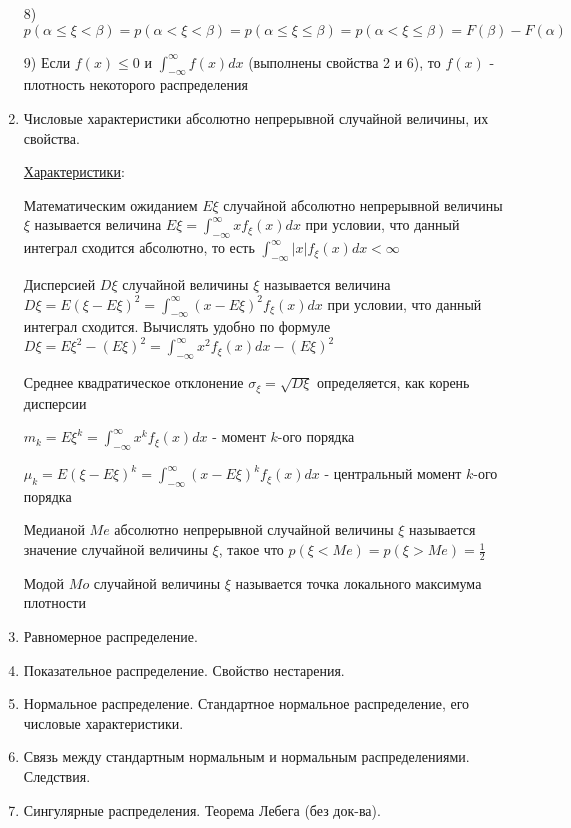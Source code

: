 \begin{enumerate}
    8) $p(\alpha \leq \xi < \beta) = p(\alpha < \xi < \beta) = p(\alpha \leq \xi \leq \beta) = p(\alpha < \xi \leq \beta) = F(\beta) - F(\alpha)$

    9) \Ths Если $f(x) \leq 0$ и $\int_{-\infty}^{\infty} f(x)dx$ (выполнены свойства 2 и 6), то $f(x)$ - плотность некоторого распределения

    \item Числовые характеристики абсолютно непрерывной случайной величины, их свойства.

    \hyperlink{attributesofcontinuousrandomvariable}{Характеристики}:

    Математическим ожиданием $E\xi$ случайной абсолютно непрерывной величины $\xi$ называется величина $E\xi = \int_{-\infty}^{\infty} xf_\xi(x) dx$ 
    при условии, что данный интеграл сходится абсолютно, то есть $\int_{-\infty}^\infty |x|f_\xi(x)dx < \infty$

    Дисперсией $D\xi$ случайной величины $\xi$ называется величина $D\xi = E(\xi - E\xi)^2 = \int_{-\infty}^\infty (x - E\xi)^2 f_\xi(x) dx$ при условии,
    что данный интеграл сходится. Вычислять удобно по формуле $D\xi = E\xi^2 - (E\xi)^2 = \int_{-\infty}^\infty x^2 f_\xi(x)dx - (E\xi)^2$

    Среднее квадратическое отклонение $\sigma_\xi = \sqrt{D\xi}$ определяется, как корень дисперсии

    $m_k = E\xi^k = \int_{-\infty}^\infty x^k f_\xi(x)dx$ - момент $k$-ого порядка

    $\mu_k = E(\xi - E\xi)^k = \int_{-\infty}^\infty (x - E\xi)^k f_\xi(x)dx$ - центральный момент $k$-ого порядка
    
    Медианой $Me$ абсолютно непрерывной случайной величины $\xi$ называется значение случайной величины $\xi$, такое что $p(\xi < Me) = p(\xi > Me) = \frac{1}{2}$
    
    Модой $Mo$ случайной величины $\xi$ называется точка локального максимума плотности

    \item Равномерное распределение. 
    \item Показательное распределение. Свойство нестарения.
    \item Нормальное распределение. Стандартное нормальное распределение, его числовые характеристики.
    \item Связь между стандартным нормальным и нормальным распределениями. Следствия.
    \item Сингулярные распределения. Теорема Лебега (без док-ва).


\end{enumerate}
